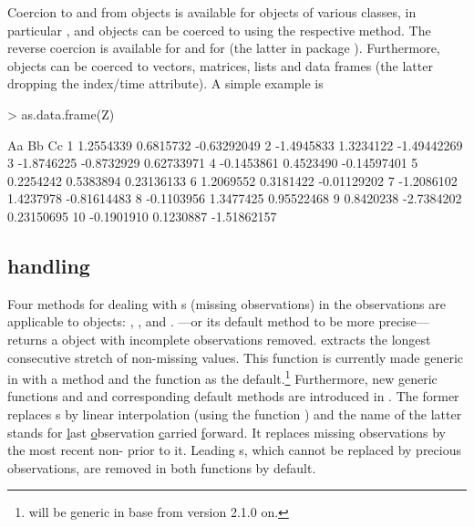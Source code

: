 \documentclass{Z}
\begin{document}
Coercion to and from  objects is available for objects of
various classes, in particular ,  and 
objects can be coerced to  using the  respective 
method. The reverse coercion is available for  and for 
(the latter in package ).
Furthermore,  objects can be coerced to vectors, matrices, lists and
data frames (the latter dropping the index/time attribute). A simple example is
\begin{Schunk}
\begin{Sinput}
> as.data.frame(Z)
\end{Sinput}
\begin{Soutput}
           Aa         Bb          Cc
1   1.2554339  0.6815732 -0.63292049
2  -1.4945833  1.3234122 -1.49442269
3  -1.8746225 -0.8732929  0.62733971
4  -0.1453861  0.4523490 -0.14597401
5   0.2254242  0.5383894  0.23136133
6   1.2069552  0.3181422 -0.01129202
7  -1.2086102  1.4237978 -0.81614483
8  -0.1103956  1.3477425  0.95522468
9   0.8420238 -2.7384202  0.23150695
10 -0.1901910  0.1230887 -1.51862157
\end{Soutput}
\end{Schunk}


\subsection[NA handling]{ handling}
\label{sec:NA}

Four methods for dealing with s (missing observations) 
in the observations are applicable to  objects:
, ,  and .
---or its default method to be more precise---returns a 
object with incomplete observations removed. 
extracts the longest consecutive stretch of non-missing values.
This function is currently made generic in 
with a  method and the  function
as the default.\footnote{
will be generic in base  from version 2.1.0 on.}
Furthermore, new generic functions
 and  and corresponding default methods are introduced in .
The former replaces s by linear interpolation (using the
function ) and the name of the latter
stands for \underline{l}ast \underline{o}bservation \underline{c}arried
\underline{f}orward. It replaces missing observations by the most recent
non- prior to it. Leading s, which cannot be replaced
by precious observations, are removed in both functions by default.
\end{document}
